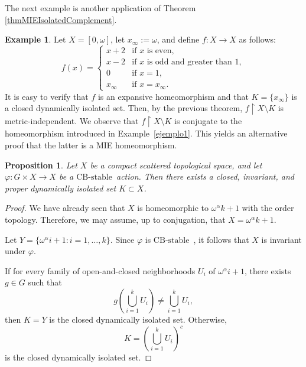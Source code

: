 \documentclass[12pt]{amsart}
\theoremstyle{plain}
\newtheorem{proposition}[theorem]{Proposition}
\theoremstyle{definition}
\newtheorem{example}[theorem]{Example}
\theoremstyle{remark}
\newcommand{\CBstable}{\ensuremath{\mathrm{CB\text{-}stable}}\ }
\begin{document}

The next example is another application of Theorem \ref{thmMIEIsolatedComplement}.




\begin{example}
Let \(X = [0, \omega ]\), let \(x_{\infty} := \omega \), and define \(f : X \rightarrow X\) as follows:
\[
f(x) = 
\begin{cases}
x + 2 & \text{if } x \text{ is even}, \\
x - 2 & \text{if } x \text{ is odd and greater than 1}, \\
0     & \text{if } x = 1, \\
x_{\infty} & \text{if } x = x_{\infty}.
\end{cases}
\]
It is easy to verify that \(f\) is an expansive homeomorphism and that \(K = \{x_{\infty}\}\) is a closed dynamically isolated set. Then, by the previous theorem, \(f \upharpoonright X \setminus K\) is metric-independent. We observe that \(f \upharpoonright X \setminus K\) is conjugate to the homeomorphism introduced in Example~\ref{ejemplo1}. This yields an alternative proof that the latter is a MIE homeomorphism.
\end{example}





\begin{proposition}
Let \(X\) be a compact scattered topological space, and let \(\varphi : G \times X \rightarrow X\) be a \CBstable action. Then there exists a closed, invariant, and proper dynamically isolated set \(K \subset X\).
\end{proposition}


\begin{proof}
We have already seen that $X$ is homeomorphic to $\omega^{\alpha}k + 1$ with the order topology. Therefore, we may assume, up to conjugation, that $X = \omega^{\alpha}k + 1$.

Let $Y = \lbrace \omega^{\alpha}i + 1 : i = 1, \ldots, k \rbrace$. Since $\varphi$ is \CBstable, it follows that $X$ is invariant under $\varphi$. 

If for every family of open-and-closed neighborhoods $U_i$ of $\omega^{\alpha}i + 1$, there exists $g \in G$ such that
\[
g\left( \bigcup_{i=1}^{k} U_i \right) \neq \bigcup_{i=1}^{k} U_i,
\]
then $K = Y$ is the closed dynamically isolated set. Otherwise, 
\[
K = \left( \bigcup_{i=1}^{k} U_i \right)^c
\]
is the closed dynamically isolated set.
\end{proof}
\end{document}
